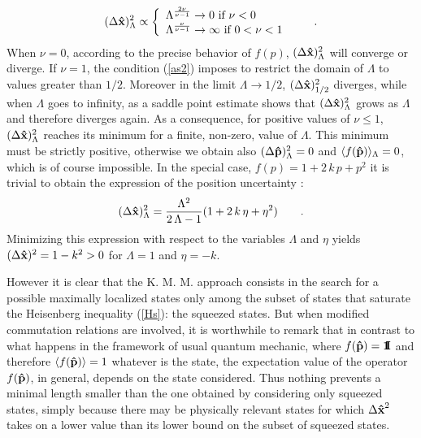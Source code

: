 \documentclass[a4paper,10pt]{article}
\newcommand{\x}{\mbox{\rm{\bf \^ x}}}
\newcommand{\p}{\mbox{\rm{\bf \^ p}}}
\newcommand{\Id}{\mbox{\rm \bf 1\hspace{-1.2 mm}I}}%
\newcommand{\KMM}{K. M. M. }
\begin{document}
\begin{equation}
(\Delta \x)^2_{\Lambda} \propto \left\{
\begin{array}{l}
\Lambda^{\frac{2\nu}{\nu-1}}\rightarrow 0\ \mbox{\rm if}\ \nu<0\\
\Lambda^{\frac{\nu}{\nu-1}}\rightarrow \infty\ \mbox{\rm if}\
0<\nu<1
\end{array}\right.\qquad .
\end{equation}
When $\nu=0$, according to the precise behavior of $f(p)$,
$(\Delta \x)^2_{\Lambda}$ will converge or diverge. If $\nu=1$,
the condition (\ref{as2}) imposes to restrict the domain of
$\Lambda$ to values greater than $1/2$. Moreover in the limit
$\Lambda\to 1/2$, $(\Delta \x)^2_{1/2}$ diverges, while when
$\Lambda$ goes to infinity, as a saddle point estimate shows that
$(\Delta \x)^2_{\Lambda}$ grows as $\Lambda$ and therefore
diverges again. As a consequence, for positive values of $\nu\leq
1$, $(\Delta \x)^2_{\Lambda}$ reaches its minimum for a finite,
non-zero, value of $\Lambda$. This minimum must be strictly
positive, otherwise we obtain also $(\Delta \p)^2_{\Lambda}=0$ and
$\langle f(\p)\rangle_\Lambda=0$, which is of course impossible.
In the special case, $f(p)=1+2\,k\,p+p^{2}$ it is trivial to
obtain the expression of the position uncertainty :
\begin{equation}
(\Delta
\x)^2_{\Lambda}=\frac{\Lambda^{2}}{2\,\Lambda-1}(1+2\,k\,\eta+\eta^{2})
\qquad .
\end{equation}
Minimizing this expression with respect to the variables $\Lambda$
and $\eta$ yields $(\Delta \x)^2 = 1-k^2>0$ for $\Lambda = 1$ and
$\eta = -k$.

However it is clear that the \KMM approach consists in the search
for a possible maximally localized states only among the subset of
states that saturate the Heisenberg inequality (\ref{Hs}): the
squeezed states. But when modified commutation relations are
involved, it is worthwhile to remark that in contrast to what
happens in the framework of usual quantum mechanic, where
$f(\p)=\Id$ and therefore $\langle f(\p)\rangle =1$ whatever is
the state, the expectation value of the operator $f(\p)$, in
general, depends on the state considered. Thus nothing prevents a
minimal length smaller than the one obtained by considering only
squeezed states, simply because there may be physically relevant
states for which $\Delta\x^2$ takes on a lower value than its
lower bound on the subset of squeezed states.
\end{document}
